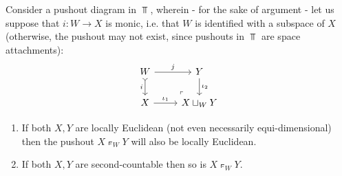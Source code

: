         \begin{lemma} \label{lemma: properties_of_pushouts_of_spaces}
            Consider a pushout diagram in $\Top$, wherein - for the sake of argument - let us suppose that $i: W \to X$ is monic, i.e. that $W$ is identified with a subspace of $X$ (otherwise, the pushout may not exist, since pushouts in $\Top$ are space attachments):
                $$
                    \begin{tikzcd}
                    W & Y \\
                    X & {X \pushout_W Y}
                    \arrow["j", from=1-1, to=1-2]
                    \arrow["i"', tail, from=1-1, to=2-1]
                    \arrow["{\iota_2}", from=1-2, to=2-2]
                    \arrow["{\iota_1}", from=2-1, to=2-2]
                    \arrow["\lrcorner"{anchor=center, pos=0.125, rotate=180}, draw=none, from=2-2, to=1-1]
                    \end{tikzcd}
                $$
            \begin{enumerate}
                \item If both $X, Y$ are locally Euclidean (not even necessarily equi-dimensional) then the pushout $X \pushout_W Y$ will also be locally Euclidean.
                \item If both $X, Y$ are second-countable then so is $X \pushout_W Y$.
            \end{enumerate}
        \end{lemma}
